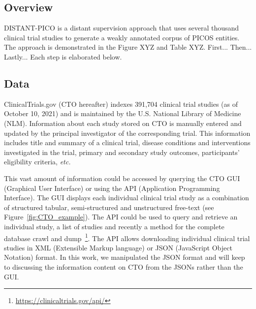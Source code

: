 \documentclass[10.7pt,]{article}
\begin{document}
\subsection{Overview}\label{overview}
%
DISTANT-PICO is a distant supervision approach that uses several thousand clinical trial studies to generate a weakly annotated corpus of PICOS entities.
The approach is demonstrated in the Figure XYZ and Table XYZ.
First...
Then...
Lastly...
Each step is elaborated below.
%
%
%
\subsection{Data}\label{data}
%
ClinicalTrials.gov (CTO hereafter) indexes 391,704 clinical trial studies (as of October 10, 2021) and is maintained by the U.S. National Library of Medicine (NLM).
Information about each study stored on CTO is manually entered and updated by the principal investigator of the corresponding trial.
This information includes title and summary of a clinical trial, disease conditions and interventions investigated in the trial, primary and secondary study outcomes, participants' eligibility criteria, \textit{etc.}

This vast amount of information could be accessed by querying the CTO GUI (Graphical User Interface) or using the API (Application Programming Interface).
The GUI displays each individual clinical trial study as a combination of structured tabular, semi-structured and unstructured free-text (see Figure~\ref{fig:CTO_example}).
The API could be used to query and retrieve an individual study, a list of studies and recently a method for the complete database crawl and dump~\footnote{\url{https://clinicaltrials.gov/api/}}.
The API allows downloading individual clinical trial studies in XML (Extensible Markup language) or JSON (JavaScript Object Notation) format.
In this work, we manipulated the JSON format and will keep to discussing the information content on CTO from the JSONs rather than the GUI.
\end{document}
